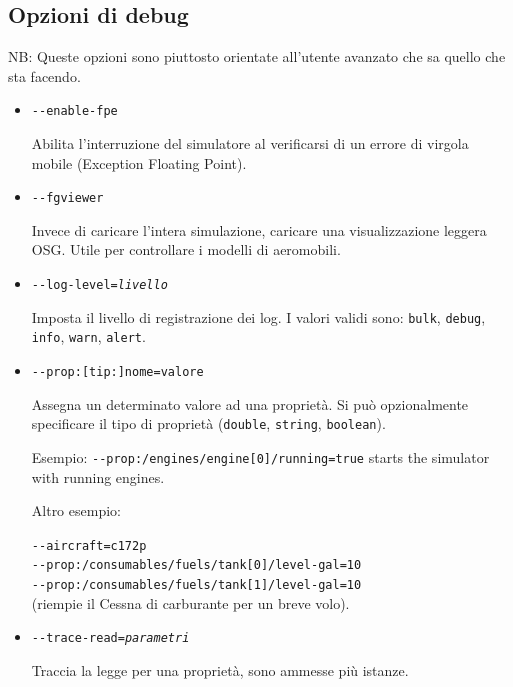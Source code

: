 \begin{itemize}
{  \subsection{Opzioni di debug}

  NB: Queste opzioni sono piuttosto orientate all'utente avanzato che sa quello che sta facendo.

  \begin{itemize}

  \item{\texttt{-$ $-enable-fpe}}

  Abilita l'interruzione del simulatore al verificarsi di un errore di virgola mobile (Exception Floating Point).

  \item{\texttt{-$ $-fgviewer}}

  Invece di caricare l'intera simulazione, caricare una visualizzazione leggera OSG. Utile per controllare i modelli di aeromobili.

  \item{\texttt{-$ $-log-level={\it livello}}}

  Imposta il livello di registrazione dei log. I valori validi sono: \texttt{bulk}, \texttt{debug}, \texttt{info}, \texttt{warn}, \texttt{alert}.

  \item{\texttt{-$ $-prop:[tip:]nome=valore}}

  Assegna un determinato valore ad una propriet\`{a}. Si pu\`{o} opzionalmente
  specificare il tipo di propriet\`{a} (\texttt{double}, \texttt{string}, \texttt{boolean}).

  Esempio: \texttt{-$ $-prop:/engines/engine[0]/running=true} starts the simulator with running engines.

  Altro esempio:

  \texttt{-$ $-aircraft=c172p}\\
  \texttt{-$ $-prop:/consumables/fuels/tank[0]/level-gal=10}\\
  \texttt{-$ $-prop:/consumables/fuels/tank[1]/level-gal=10}\\

  (riempie il Cessna di carburante per un breve volo).

  \item{\texttt{-$ $-trace-read={\it parametri}}}

  Traccia la legge per una propriet\`{a}, sono ammesse pi\`{u} istanze.


\end{itemize}}
\end{itemize}
